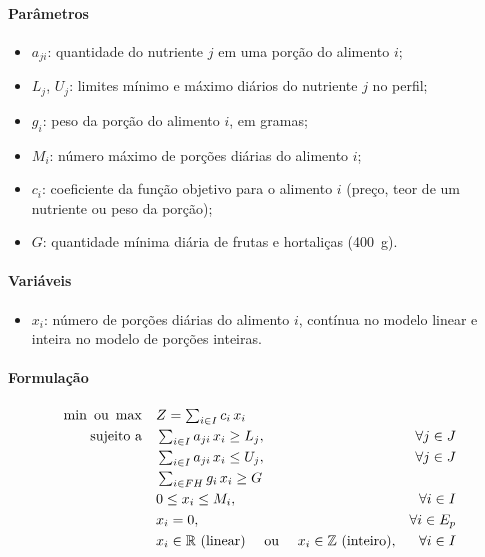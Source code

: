 \documentclass[12pt]{article}
\begin{document}
\paragraph{Parâmetros}
\begin{itemize}
  \item $a_{ji}$: quantidade do nutriente $j$ em uma porção do alimento $i$;
  \item $L_j$, $U_j$: limites mínimo e máximo diários do nutriente $j$ no perfil;
  \item $g_i$: peso da porção do alimento $i$, em gramas;
  \item $M_i$: número máximo de porções diárias do alimento $i$;
  \item $c_i$: coeficiente da função objetivo para o alimento $i$ (preço, teor de um
        nutriente ou peso da porção);
  \item $G$: quantidade mínima diária de frutas e hortaliças (400~g).
\end{itemize}

\paragraph{Variáveis}
\begin{itemize}
  \item $x_i$: número de porções diárias do alimento $i$, contínua no modelo linear e
        inteira no modelo de porções inteiras.
\end{itemize}

\paragraph{Formulação}
\begin{align}
\min \text{ ou } \max \quad & Z = \textstyle\sum_{i \in I} c_i\, x_i \label{eq:fo}\\
\text{sujeito a} \quad
  & \textstyle\sum_{i \in I} a_{ji}\, x_i \geq L_j, & \forall j \in J \label{eq:min}\\
  & \textstyle\sum_{i \in I} a_{ji}\, x_i \leq U_j, & \forall j \in J \label{eq:max}\\
  & \textstyle\sum_{i \in FH} g_i\, x_i \geq G \label{eq:fh}\\
  & 0 \leq x_i \leq M_i, & \forall i \in I \label{eq:lim}\\
  & x_i = 0, & \forall i \in E_p \label{eq:exc}\\
  & x_i \in \mathbb{R} \text{ (linear) \quad ou \quad} x_i \in \mathbb{Z} \text{ (inteiro)}, & \forall i \in I \label{eq:dom}
\end{align}
\end{document}
